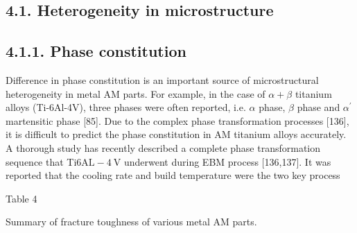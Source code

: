 \documentclass[10pt]{article}
\begin{document}
\subsection*{4.1. Heterogeneity in microstructure}
\subsection*{4.1.1. Phase constitution}
Difference in phase constitution is an important source of microstructural heterogeneity in metal AM parts. For example, in the case of $\alpha+\beta$ titanium alloys (Ti-6Al-4V), three phases were often reported, i.e. $\alpha$ phase, $\beta$ phase and $\alpha^{\prime}$ martensitic phase [85]. Due to the complex phase transformation processes [136], it is difficult to predict the phase constitution in AM titanium alloys accurately. A thorough study has recently described a complete phase transformation sequence that Ti$6 \mathrm{AL}-4 \mathrm{~V}$ underwent during EBM process [136,137]. It was reported that the cooling rate and build temperature were the two key process

Table 4

Summary of fracture toughness of various metal AM parts.
\end{document}
